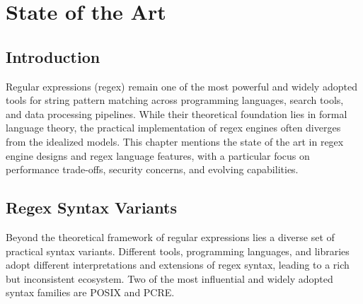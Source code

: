 \chapter{State of the Art}\label{chap:art}

\section{Introduction}
Regular expressions (regex) remain one of the most powerful and widely adopted tools for string pattern matching across programming languages, search tools, and data processing pipelines. While their theoretical foundation lies in formal language theory, the practical implementation of regex engines often diverges from the idealized models. This chapter mentions the state of the art in regex engine designs and regex language features, with a particular focus on performance trade-offs, security concerns, and evolving capabilities.

\section{Regex Syntax Variants}
\label{sec:regex_syntax}

Beyond the theoretical framework of regular expressions lies a diverse set of practical syntax variants. Different tools, programming languages, and libraries adopt different interpretations and extensions of regex syntax, leading to a rich but inconsistent ecosystem. Two of the most influential and widely adopted syntax families are POSIX and PCRE.


